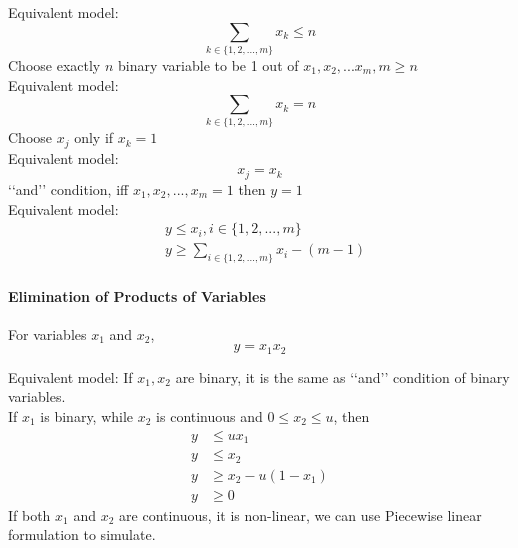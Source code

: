                 Equivalent model:
                \begin{equation*}
                    \sum_{k\in \{1,2,...,m\}} x_k \le n
                \end{equation*}
                 Choose exactly $n$ binary variable to be 1 out of  $x_1, x_2, ... x_m, m\ge n$\\
                
                Equivalent model:
                \begin{equation*}
                    \sum_{k\in \{1,2,...,m\}} x_k = n
                \end{equation*}
                 Choose $x_j$ only if $x_k = 1$\\
                
                Equivalent model:
                \begin{equation*}x_j = x_k  \end{equation*}
                 \lq\lq{}and\rq\rq{} condition, iff $x_1, x_2, ... , x_m =1$ then $y=1$\\
                
                Equivalent model:
                \begin{align*}
                    & y \le x_i, i\in \{1, 2, ..., m\}  \\
                    & y \ge \sum_{i \in \{1, 2, ..., m\}} x_i - (m - 1) 
                \end{align*}

            \paragraph{Elimination of Products of Variables}
                 For variables $x_1$ and $x_2$,
                \begin{equation*}y = x_1 x_2\end{equation*}
                
                Equivalent model: If $x_1, x_2$ are binary, it is the same as \lq\lq{}and\rq\rq{} condition of binary variables.\\
                If $x_1$ is binary, while $x_2$ is continuous and $0 \le x_2 \le u$, then
                \begin{align*}
                    y &\le ux_1  \\
                    y &\le x_2  \\
                    y &\ge x_2 - u(1- x_1)  \\
                    y &\ge 0 
                \end{align*}
                If both $x_1$ and $x_2$ are continuous, it is non-linear, we can use Piecewise linear formulation to simulate.

